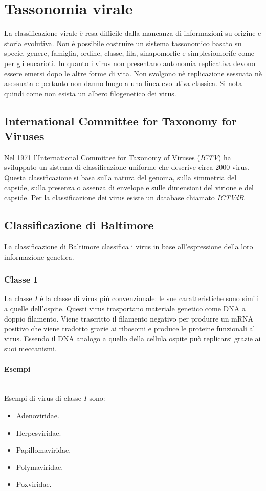 \section{Tassonomia virale}
La classificazione virale \`e resa difficile dalla mancanza di informazioni su origine e storia evolutiva.
Non \`e possibile costruire un sistema tassonomico basato su specie, genere, famiglia, ordine, classe, fila, sinapomorfie e simplesiomorife come per gli eucarioti.
In quanto i virus non presentano autonomia replicativa devono essere emersi dopo le altre forme di vita.
Non svolgono n\`e replicazione sessuata n\`e asessuata e pertanto non danno luogo a una linea evolutiva classica. 
Si nota quindi come non esista un albero filogenetico dei virus. 

	\subsection{International Committee for Taxonomy for Viruses}
	Nel 1971 l'International Committee for Taxonomy of Viruses (\emph{ICTV}) ha sviluppato un sistema di classificazione uniforme che descrive circa $2000$ virus. 
	Questa classificazione si basa sulla natura del genoma, sulla simmetria del capside, sulla presenza o assenza di envelope e sulle dimensioni del virione e del capside. 
	Per la classificazione dei virus esiste un database chiamato \emph{ICTVdB}.

	\subsection{Classificazione di Baltimore}
	La classificazione di Baltimore classifica i virus in base all'espressione della loro informazione genetica.
	
		\subsubsection{Classe $\mathbf{I}$}
		La classe $I$ \`e la classe di virus pi\`u convenzionale: le sue caratteristiche sono simili a quelle dell'ospite.
		Questi virus trasportano materiale genetico come DNA a doppio filamento.
		Viene trascritto il filamento negativo per produrre un mRNA positivo che viene tradotto grazie ai ribosomi e produce le proteine funzionali al virus.
		Essendo il DNA analogo a quello della cellula ospite pu\`o replicarsi grazie ai suoi meccanismi.

			\paragraph{Esempi}\mbox{}\\
			Esempi di virus di classe $I$ sono:
			\begin{multicols}{3}
				\begin{itemize}
					\item Adenoviridae.
					\item Herpesviridae.
					\item Papillomaviridae.
					\item Polymaviridae.
					\item Poxviridae.
				\end{itemize}
			\end{multicols}

